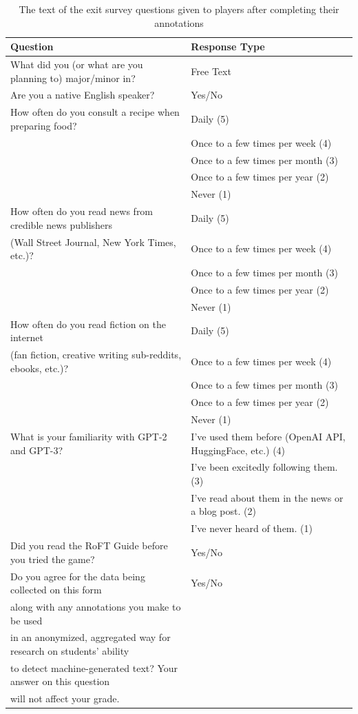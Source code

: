 \begin{table}
    \centering
    \small
    \begin{tabular}{l|l}
    \toprule
    Question & Response Type \\
    \midrule
    What did you (or what are you planning to) major/minor in? & Free Text \\\midrule
    Are you a native English speaker? & Yes/No \\\midrule
    How often do you consult a recipe when preparing food? & Daily (5) \\
    & Once to a few times per week (4) \\
    & Once to a few times per month (3) \\
    & Once to a few times per year (2) \\
    & Never (1) \\\midrule
    How often do you read news from credible news publishers & Daily (5) \\
    (Wall Street Journal, New York Times, etc.)? & Once to a few times per week (4) \\
    & Once to a few times per month (3) \\
    & Once to a few times per year (2) \\
    & Never (1) \\\midrule
    How often do you read fiction on the internet & Daily (5) \\
    (fan fiction, creative writing sub-reddits, ebooks, etc.)? & Once to a few times per week (4) \\
    & Once to a few times per month (3) \\
    & Once to a few times per year (2) \\
    & Never (1) \\\midrule
    What is your familiarity with GPT-2 and GPT-3? & I’ve used them before (OpenAI API, HuggingFace, etc.) (4) \\ 
    & I’ve been excitedly following them. (3) \\
    & I've read about them in the news or a blog post. (2) \\
    & I've never heard of them. (1) \\\midrule
    Did you read the RoFT Guide before you tried the game? & Yes/No \\\midrule
    Do you agree for the data being collected on this form & Yes/No \\
    along with any annotations you make to be used & \\
    in an anonymized, aggregated way for research on students' ability & \\
    to detect machine-generated text? Your answer on this question & \\ 
    will not affect your grade. & \\
    \bottomrule
    \end{tabular}
    \caption{The text of the exit survey questions given to players after completing their annotations}
    \label{tab:survey_questions}
\end{table}

